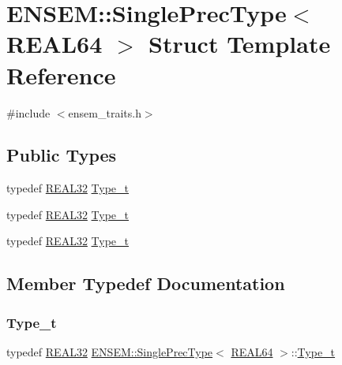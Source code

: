 \hypertarget{structENSEM_1_1SinglePrecType_3_01REAL64_01_4}{}\section{E\+N\+S\+EM\+:\+:Single\+Prec\+Type$<$ R\+E\+A\+L64 $>$ Struct Template Reference}
\label{structENSEM_1_1SinglePrecType_3_01REAL64_01_4}


{\ttfamily \#include $<$ensem\+\_\+traits.\+h$>$}

\subsection*{Public Types}
\begin{DoxyCompactItemize}
\item 
typedef \mbox{\hyperlink{namespaceENSEM_a7540d01191172323e9073283d772576d}{R\+E\+A\+L32}} \mbox{\hyperlink{structENSEM_1_1SinglePrecType_3_01REAL64_01_4_a931deb5906e330bffb27804fd850d061}{Type\+\_\+t}}
\item 
typedef \mbox{\hyperlink{namespaceENSEM_a7540d01191172323e9073283d772576d}{R\+E\+A\+L32}} \mbox{\hyperlink{structENSEM_1_1SinglePrecType_3_01REAL64_01_4_a931deb5906e330bffb27804fd850d061}{Type\+\_\+t}}
\item 
typedef \mbox{\hyperlink{namespaceENSEM_a7540d01191172323e9073283d772576d}{R\+E\+A\+L32}} \mbox{\hyperlink{structENSEM_1_1SinglePrecType_3_01REAL64_01_4_a931deb5906e330bffb27804fd850d061}{Type\+\_\+t}}
\end{DoxyCompactItemize}


\subsection{Member Typedef Documentation}
\mbox{\label{structENSEM_1_1SinglePrecType_3_01REAL64_01_4_a931deb5906e330bffb27804fd850d061}} 
\subsubsection{\texorpdfstring{Type\_t}{Type\_t}\hspace{0.1cm}{\footnotesize\ttfamily [1/3]}}
{\footnotesize\ttfamily typedef \mbox{\hyperlink{namespaceENSEM_a7540d01191172323e9073283d772576d}{R\+E\+A\+L32}} \mbox{\hyperlink{structENSEM_1_1SinglePrecType}{E\+N\+S\+E\+M\+::\+Single\+Prec\+Type}}$<$ \mbox{\hyperlink{namespaceENSEM_a85b215b9f1f43715aebee01718e25082}{R\+E\+A\+L64}} $>$\+::\mbox{\hyperlink{structENSEM_1_1SinglePrecType_3_01REAL64_01_4_a931deb5906e330bffb27804fd850d061}{Type\+\_\+t}}}

